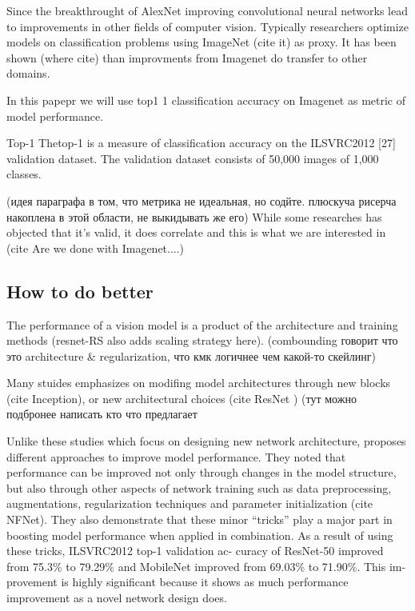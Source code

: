 Since the breakthrought of AlexNet improving convolutional neural networks lead to improvements in other fields of computer vision. Typically researchers optimize models on classification problems using ImageNet (cite it) as proxy. It has been shown (where cite) than improvments from Imagenet do transfer to other domains.  

In this papepr we will use top1 1 classification accuracy on Imagenet as metric of model performance. 

Top-1 Thetop-1 is a measure of classification accuracy on the ILSVRC2012 [27] validation dataset. The validation dataset consists of 50,000 images of 1,000 classes.

(идея параграфа в том, что метрика не идеальная, но содйте. плюскуча рисерча накоплена в этой области, не выкидывать же его)
While some researches has objected that it's valid, it does correlate and this is what we are interested in (cite Are we done with Imagenet....)



\subsection{How to do better}


The performance of a vision model is a product of the architecture and training methods (resnet-RS also adds scaling strategy here).
(combounding говорит что это architecture \& regularization, что кмк логичнее чем какой-то скейлинг) 

Many stuides emphasizes on modifing model architectures through new blocks (cite Inception), or new architectural choices (cite ResNet ) (тут можно подбронее написать кто что предлагает

Unlike these studies which focus on designing new network architecture, \cite{he2019bag_of_tricks} proposes different approaches to improve model performance. They noted that performance can be improved not only through changes in the model structure, but also through other aspects of network training such as data preprocessing, augmentations, regularization techniques and parameter initialization (cite NFNet). They also demonstrate that these minor “tricks” play a major part in boosting model performance when applied in combination. As a result of using these tricks, ILSVRC2012 top-1 validation ac- curacy of ResNet-50 improved from 75.3\% to 79.29\% and MobileNet improved from 69.03\% to 71.90\%. This im- provement is highly significant because it shows as much performance improvement as a novel network design does. 

